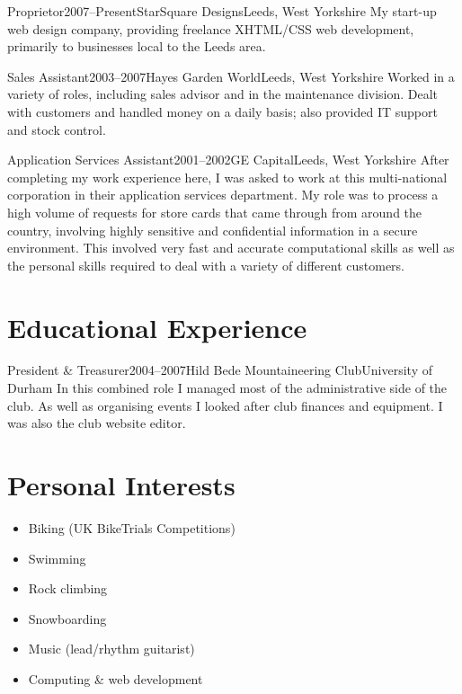 \documentclass{cv}
\begin{document}
\begin{experience}{Proprietor}{2007--Present}{StarSquare Designs}{Leeds, West Yorkshire}
My start-up web design company, providing freelance XHTML/CSS web development, primarily to businesses local to the Leeds area.
\end{experience}

\begin{experience}{Sales Assistant}{2003--2007}{Hayes Garden World}{Leeds, West Yorkshire}
Worked in a variety of roles, including sales advisor and in the maintenance division. Dealt with customers and handled money on a daily basis; also provided IT support and stock control.
\end{experience}

\begin{experience}{Application Services Assistant}{2001--2002}{GE Capital}{Leeds, West Yorkshire}
After completing my work experience here, I was asked to work at this multi-national corporation in their application services department. My role was to process a high volume of requests for store cards that came through from around the country, involving highly sensitive and confidential information in a secure environment. This involved very fast and accurate computational skills as well as the personal skills required to deal with a variety of different customers.
\end{experience}

\section{Educational Experience}

\begin{experience}{President \& Treasurer}{2004--2007}{Hild Bede Mountaineering Club}{University of Durham}
In this combined role I managed most of the administrative side of the club. As well as organising events I looked after club finances and equipment. I was also the club website editor.
\end{experience}

\section{Personal Interests}

\begin{itemize}
\item Biking (UK BikeTrials Competitions)
\item Swimming
\item Rock climbing
\item Snowboarding
\item Music (lead/rhythm guitarist)
\item Computing \& web development
\end{itemize}
\end{document}

